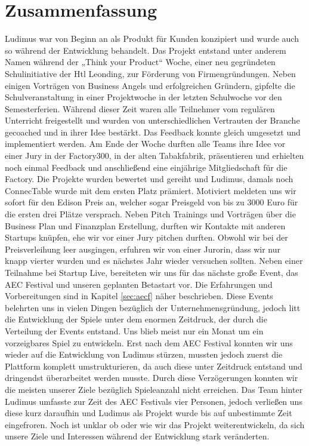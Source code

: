 \chapter{Zusammenfassung}
Ludimus war von Beginn an als Produkt für Kunden konzipiert und wurde auch so während der Entwicklung behandelt. Das Projekt entstand unter anderem Namen während der „Think your Product“ Woche, einer neu gegründeten Schulinitiative der Htl Leonding, zur Förderung von Firmengründungen. Neben einigen Vorträgen von Business Angels und erfolgreichen Gründern, gipfelte die Schulveranstaltung in einer Projektwoche in der letzten Schulwoche vor den Semesterferien. Während dieser Zeit waren alle Teilnehmer vom regulären Unterricht freigestellt und wurden von unterschiedlichen Vertrauten der Branche gecoached und in ihrer Idee bestärkt. Das Feedback konnte gleich umgesetzt und implementiert werden. Am Ende der Woche durften alle Teams ihre Idee vor einer Jury in der Factory300, in der alten Tabakfabrik, präsentieren und erhielten noch einmal Feedback und anschließend eine einjährige Mitgliedschaft für die Factory. Die Projekte wurden bewertet und gereiht und Ludimus, damals noch ConnecTable wurde mit dem ersten Platz prämiert. Motiviert meldeten uns wir sofort für den Edison Preis an, welcher sogar Preisgeld von bis zu 3000 Euro für die ersten drei Plätze versprach. Neben Pitch Trainings und Vorträgen über die Business Plan und Finanzplan Erstellung, durften wir Kontakte mit anderen Startups knüpfen, ehe wir vor einer Jury pitchen durften. Obwohl wir bei der Preisverleihung leer ausgingen, erfuhren wir von einer Jurorin, dass wir nur knapp vierter wurden und es nächstes Jahr wieder versuchen sollten. Neben einer Teilnahme bei Startup Live, bereiteten wir uns für das nächste große Event, das AEC Festival und unseren geplanten Betastart vor. Die Erfahrungen und Vorbereitungen sind in Kapitel \ref{sec:aecf} näher beschrieben. Diese Events belehrten uns in vielen Dingen bezüglich der Unternehmensgründung, jedoch litt die Entwicklung der Spiele unter dem enormen Zeitdruck, der durch die Verteilung der Events entstand. Uns blieb meist nur ein Monat um ein vorzeigbares Spiel zu entwickeln. Erst nach dem AEC Festival konnten wir uns wieder auf die Entwicklung von Ludimus stürzen, mussten jedoch zuerst die Plattform komplett umstrukturieren, da auch diese unter Zeitdruck entstand und dringendst überarbeitet werden musste. Durch diese Verzögerungen konnten wir die meisten unserer Ziele bezüglich Spieleanzahl nicht erreichen. Das Team hinter Ludimus umfasste zur Zeit des AEC Festivals vier Personen, jedoch verließen uns diese kurz daraufhin und Ludimus als Projekt wurde bis auf unbestimmte Zeit eingefroren. Noch ist unklar ob oder wie wir das Projekt weiterentwickeln, da sich unsere Ziele und Interessen während der Entwicklung stark veränderten.

